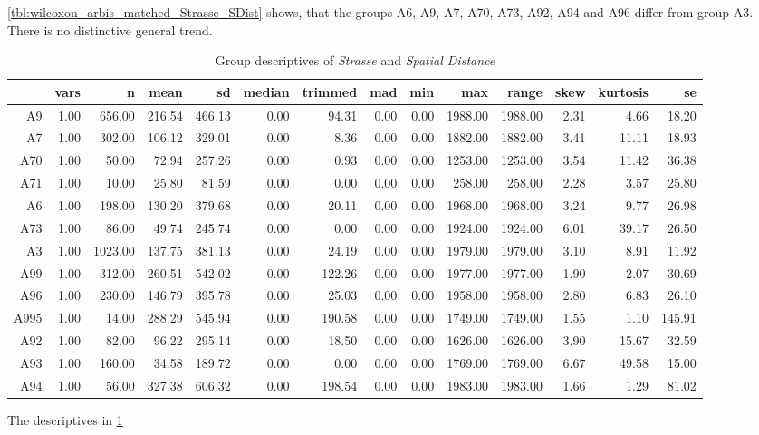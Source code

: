 \cref{tbl:wilcoxon_arbis_matched_Strasse_SDist} shows, that the groups A6, A9, A7, A70, A73, A92, A94 and A96 differ from group A3. There is no distinctive general trend.
\begin{table}[ht!]
	\tiny
	\centering
  \begin{tabular}{rrrrrrrrrrrrrr}
    \hline
    & vars & n & mean & sd & median & trimmed & mad & min & max & range & skew & kurtosis & se \\ 
    \hline
    A9   & 1.00 & 656.00 & 216.54 & 466.13 & 0.00 & 94.31 & 0.00 & 0.00 & 1988.00 & 1988.00 & 2.31 & 4.66 & 18.20 \\ 
    A7   & 1.00 & 302.00 & 106.12 & 329.01 & 0.00 & 8.36 & 0.00 & 0.00 & 1882.00 & 1882.00 & 3.41 & 11.11 & 18.93 \\ 
    A70  & 1.00 & 50.00 & 72.94 & 257.26 & 0.00 & 0.93 & 0.00 & 0.00 & 1253.00 & 1253.00 & 3.54 & 11.42 & 36.38 \\ 
    A71  & 1.00 & 10.00 & 25.80 & 81.59 & 0.00 & 0.00 & 0.00 & 0.00 & 258.00 & 258.00 & 2.28 & 3.57 & 25.80 \\ 
    A6   & 1.00 & 198.00 & 130.20 & 379.68 & 0.00 & 20.11 & 0.00 & 0.00 & 1968.00 & 1968.00 & 3.24 & 9.77 & 26.98 \\ 
    A73  & 1.00 & 86.00 & 49.74 & 245.74 & 0.00 & 0.00 & 0.00 & 0.00 & 1924.00 & 1924.00 & 6.01 & 39.17 & 26.50 \\ 
    A3   & 1.00 & 1023.00 & 137.75 & 381.13 & 0.00 & 24.19 & 0.00 & 0.00 & 1979.00 & 1979.00 & 3.10 & 8.91 & 11.92 \\ 
    A99  & 1.00 & 312.00 & 260.51 & 542.02 & 0.00 & 122.26 & 0.00 & 0.00 & 1977.00 & 1977.00 & 1.90 & 2.07 & 30.69 \\ 
    A96  & 1.00 & 230.00 & 146.79 & 395.78 & 0.00 & 25.03 & 0.00 & 0.00 & 1958.00 & 1958.00 & 2.80 & 6.83 & 26.10 \\ 
    A995 & 1.00 & 14.00 & 288.29 & 545.94 & 0.00 & 190.58 & 0.00 & 0.00 & 1749.00 & 1749.00 & 1.55 & 1.10 & 145.91 \\ 
    A92  & 1.00 & 82.00 & 96.22 & 295.14 & 0.00 & 18.50 & 0.00 & 0.00 & 1626.00 & 1626.00 & 3.90 & 15.67 & 32.59 \\ 
    A93  & 1.00 & 160.00 & 34.58 & 189.72 & 0.00 & 0.00 & 0.00 & 0.00 & 1769.00 & 1769.00 & 6.67 & 49.58 & 15.00 \\ 
    A94  & 1.00 & 56.00 & 327.38 & 606.32 & 0.00 & 198.54 & 0.00 & 0.00 & 1983.00 & 1983.00 & 1.66 & 1.29 & 81.02 \\ 
    \hline
  \end{tabular}
	\caption{Group descriptives of \textit{Strasse} and \textit{Spatial Distance}}
	\label{tbl:descriptives_arbis_matched_Strasse_SDist}
\end{table}
The descriptives in \cref{tbl:descriptives_arbis_matched_Strasse_SDist}

